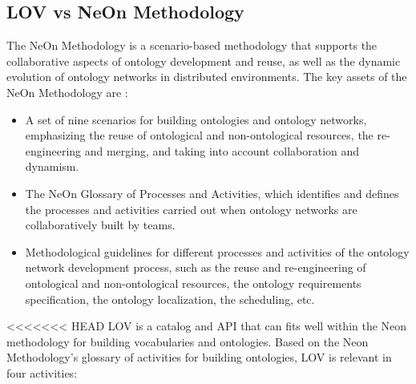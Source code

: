\subsection{LOV vs NeOn Methodology}
\label{sec:Lovandneon}
The NeOn Methodology is a scenario-based methodology that supports the collaborative aspects of ontology development and reuse, as well as the dynamic evolution of ontology networks in distributed environments. The key assets of the NeOn Methodology are \cite{MC10}:
\begin{itemize}
 \item  A set of nine scenarios for building ontologies and ontology networks, emphasizing the reuse of ontological and non-ontological resources, the re-engineering and merging, and taking into account collaboration and dynamism.
 \item The NeOn Glossary of Processes and Activities, which identifies and defines the processes and activities carried out when ontology networks are collaboratively built by teams.
 \item Methodological guidelines for different processes and activities of the ontology network development process, such as the reuse and re-engineering of ontological and non-ontological resources, the ontology requirements specification, the ontology localization, the scheduling, etc.
\end{itemize}

<<<<<<< HEAD
 LOV is a catalog and API that can fits well within the Neon methodology for building vocabularies and ontologies.  Based on the Neon Methodology's glossary of activities for building ontologies, LOV is relevant in four activities:
		
